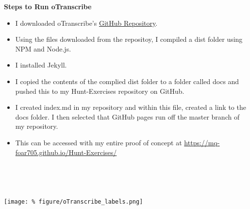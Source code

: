 \documentclass[unknownkeysallowed,usepdftitle=false, parskip=full]{beamer}
\newcommand{\secvariable}{nothing}
\newcommand{\mysection}[1]{\renewcommand{\secvariable}{#1}
}
\begin{document}
\mysection{radar}
\begin{frame}\label{\secvariable}
  
\textbf{Steps to Run oTranscribe}

\begin{itemize}
   \item I downloaded oTranscribe's \href{https://github.com/oTranscribe/oTranscribe}{GitHub Repository}.
   \item Using the files downloaded from the repositoy, I compiled a dist folder using NPM and Node.js.
   \item I installed Jekyll.
   \item I copied the contents of the complied dist folder to a folder called docs and pushed this to my Hunt-Exercises repository on GitHub.
   \item I created index.md in my repository and within this file, created a link to the docs folder. I then selected that GitHub pages run off the master branch of my repository.
   \item This can be accessed with my entire proof of concept at \url{https://mq-foar705.github.io/Hunt-Exercises/}
\end{itemize}  
      
      \hyperlink{oTranscribe_interface}{}\\

\end{frame}

\begin{frame}\label{\secvariable}
\label{oTranscribe_interface}
\hyperlink{radar}{}\\
\begin{center}
  \vspace{-0.2cm}
 \texttt{[image: \%
  figure/oTranscribe\_labels.png]}
\end{center}
\end{frame}
\end{document}
